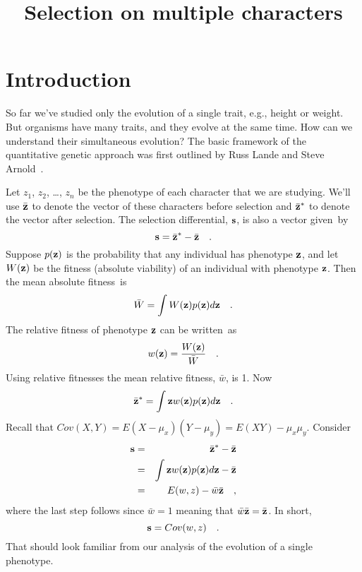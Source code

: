 \documentclass[12pt]{article}
\title{Selection on multiple characters}
\begin{document}
\maketitle

\thispagestyle{first}

\section*{Introduction}

So far we've studied only the evolution of a single trait, e.g.,
height or weight. But organisms have many traits, and they evolve at
the same time. How can we understand their simultaneous evolution? The
basic framework of the quantitative genetic approach was first
outlined by Russ Lande and Steve
Arnold~\cite{Lande-Arnold-1983}.

Let $z_1$, $z_2$, \dots, $z_n$ be the phenotype of each character that
we are studying. We'll use $\bar{\bf z}$ to denote the vector of these
characters before selection and $\bar{\bf z}^*$ to denote the vector after
selection. The selection differential, $\bf s$, is also a vector
given~by
\[
{\bf s} = \bar{\bf z}^* - \bar{\bf z} \quad .
\]
Suppose $p({\bf z})$ is the probability that any individual has
phenotype $\bf z$, and let $W({\bf z})$ be the fitness (absolute
viability) of an individual with phenotype $\bf z$. Then the mean
absolute fitness~is
\[
\bar W = \int W({\bf z})p({\bf z})d{\bf z} \quad .
\]
The relative fitness of phenotype $\bf z$ can be written~as
\[
w({\bf z}) = {W({\bf z}) \over \bar W} \quad .
\]
Using relative fitnesses the mean relative fitness, $\bar w$, is
1. Now
\[
\bar{\bf z}^* = \int {\bf z}w({\bf z})p({\bf z})d{\bf z} \quad .
\]
Recall that $Cov(X,Y) = E(X - \mu_x)(Y - \mu_y) = E(XY) -
\mu_x\mu_y$. Consider 
\begin{eqnarray*}
{\bf s} &=& \bar{\bf z}^* - \bar{\bf z} \\
        &=& \int {\bf z}w({\bf z})p({\bf z})d{\bf z} - \bar {\bf z} \\
        &=& E(w,z) - \bar w\bar {\bf z} \quad ,
\end{eqnarray*}
where the last step follows since $\bar w = 1$ meaning that $\bar
w\bar{\bf z} = \bar{\bf z}$. In short, 
\[
{\bf s} = Cov(w,z) \quad .
\]
That should look familiar from our analysis of the evolution of a
single phenotype.
\end{document}
